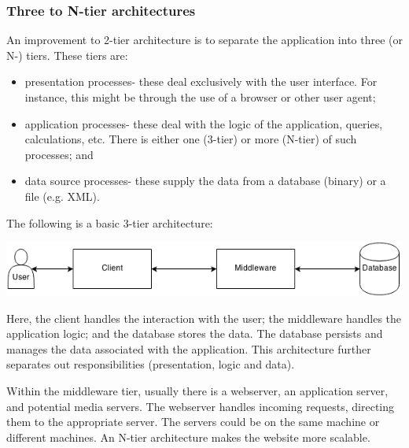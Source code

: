 \documentclass[a4paper, openany]{memoir}
\begin{document}
\subsubsection{Three to N-tier architectures}
An improvement to 2-tier architecture is to separate the application into three (or N-) tiers. These tiers are:
\begin{itemize}
    \item presentation processes- these deal exclusively with the user interface. For instance, this might be through the use of a browser or other user agent;
    \item application processes- these deal with the logic of the application, queries, calculations, etc. There is either one (3-tier) or more (N-tier) of such processes; and
    \item data source processes- these supply the data from a database (binary) or a file (e.g. XML).
\end{itemize}
The following is a basic 3-tier architecture:
\begin{center}
    \includegraphics[scale=0.8]{src/L8I1.png}
\end{center}
Here, the client handles the interaction with the user; the middleware handles the application logic; and the database stores the data. The database persists and manages the data associated with the application. This architecture further separates out responsibilities (presentation, logic and data).

\noindent Within the middleware tier, usually there is a webserver, an application server, and potential media servers. The webserver handles incoming requests, directing them to the appropriate server. The servers could be on the same machine or different machines. An N-tier architecture makes the website more scalable.
\end{document}
